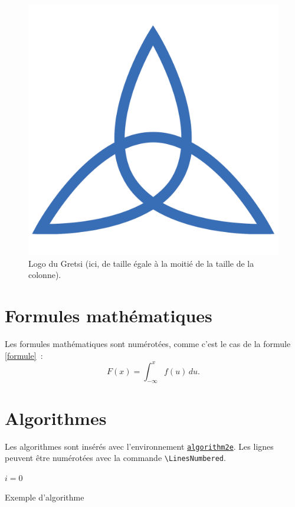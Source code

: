 \documentclass[francais]{gretsi}
\begin{document}
\begin{figure}[htb]
  \begin{center}
    \includegraphics[width=.5\columnwidth]{logo}
  \end{center}
  \caption{Logo du Gretsi (ici, de taille égale à la moitié de la taille de la colonne).}
  \label{logo}
\end{figure}


\section{Formules mathématiques}

Les formules mathématiques sont numérotées, comme c'est le cas de la formule \ref{formule}~:
\begin{equation}
  \label{formule}
  F(x) = \int_{-\infty}^x f(u)\,du.
\end{equation}


\section{Algorithmes}

Les algorithmes sont insérés avec l'environnement \href{https://distrib-coffee.ipsl.jussieu.fr/pub/mirrors/ctan/macros/latex/contrib/algorithm2e/doc/algorithm2e.pdf}{\texttt{algorithm2e}}.
Les lignes peuvent être numérotées avec la commande \verb!\LinesNumbered!.

\LinesNumbered
\begin{algorithm}
  $i = 0$ \\
  \caption{Exemple d'algorithme}
\end{algorithm}
\end{document}
